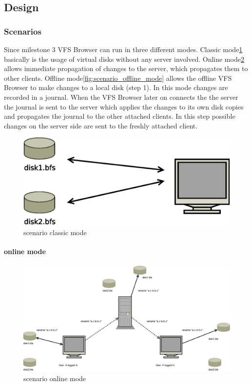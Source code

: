 \subsection{Design}


\subsubsection{Scenarios}

Since milestone 3 VFS Browser can run in three different modes. Classic
mode\ref{fig:scenario_classic_mode} basically is the usage of virtual disks without any
server involved. Online mode\ref{fig:scenario_online_mode} allows immediate
propagation of changes to the server, which propagates them to other clients.
Offline mode\ref{fig:scenario_offline_mode} allows the offline VFS Browser to
make changes to a local disk (step 1). In this mode
changes are recorded in a journal. When the VFS Browser later on connects the
the server the journal is sent to the server which applies the changes to its 
own disk copies and propagates the journal to the other attached clients. In
this step possible changes on the server side are sent to the freshly attached
client. 

\begin{figure}[h!]
\centering
\includegraphics[width=1\textwidth]{figures/scenario_classic_mode.eps}
\caption{scenario classic mode}
\label{fig:scenario_classic_mode}
\end{figure}

\paragraph{online mode}

\begin{figure}[h!]
\centering
\includegraphics[width=1\textwidth]{figures/scenario_online_mode.eps}
\caption{scenario online mode}
\label{fig:scenario_online_mode}
\end{figure}

